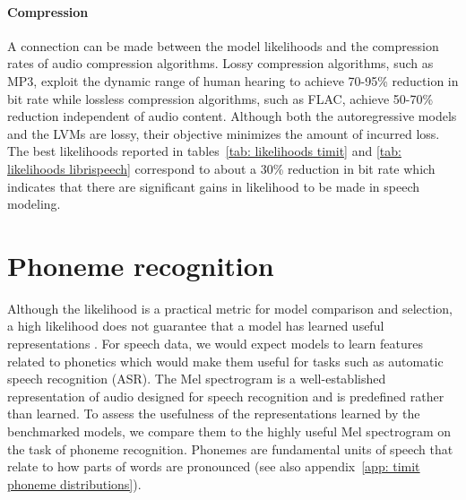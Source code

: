 {\paragraph{Compression}
A connection can be made between the model likelihoods and the compression rates of audio compression algorithms. 
Lossy compression algorithms, such as MP3, exploit the dynamic range of human hearing to achieve 70-95\% reduction in bit rate \cite{brandenburg_mpeg-2_1998} while lossless compression algorithms, such as FLAC, achieve 50-70\% reduction \cite{coalson_free_2019} independent of audio content. 
Although both the autoregressive models and the LVMs are lossy, their objective minimizes the amount of incurred loss. 
The best likelihoods reported in tables~\cref{tab: likelihoods timit} and \cref{tab: likelihoods librispeech} correspond to about a 30\% reduction in bit rate which indicates that there are significant gains in likelihood to be made in speech modeling.

\section{Phoneme recognition}\label{sec: phoneme recognition}
Although the likelihood is a practical metric for model comparison and selection, a high likelihood does not guarantee that a model has learned useful representations \cite{huszar_is_2017}. 
For speech data, we would expect models to learn features related to phonetics which would make them useful for tasks such as automatic speech recognition (ASR). 
The Mel spectrogram is a well-established representation of audio designed for speech recognition and is predefined rather than learned. %
To assess the usefulness of the representations learned by the benchmarked models, we compare them to the highly useful Mel spectrogram on the task of phoneme recognition. 
Phonemes are fundamental units of speech that relate to how parts of words are pronounced (see also appendix~\cref{app: timit phoneme distributions}).

}
